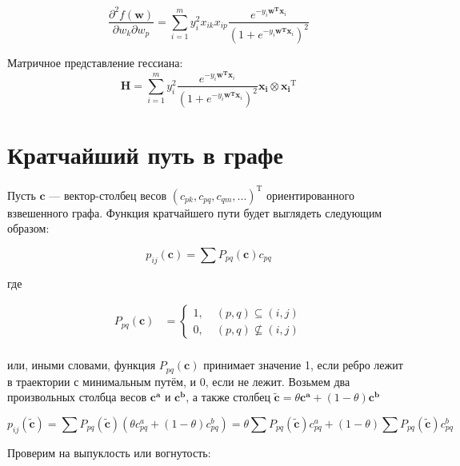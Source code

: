 	\begin{equation}
	\frac{\partial^2 f(\mathbf{w})}{\partial w_k \partial w_p}= \sum\limits_{i=1}^m
	y_i^2 x_{ik} x_{ip} \frac{e^{-y_i \mathbf{w^T x}_i}}{(1+e^{-y_i \mathbf{w^T
				x}_i})^2}
	\end{equation}	
	
	Матричное представление гессиана:
	\begin{equation}
	\mathbf{H} = \sum\limits_{i=1}^m y_i^2  \frac{e^{-y_i \mathbf{w^T
				x}_i}}{(1+e^{-y_i \mathbf{w^T x}_i})^2} \mathbf{x_i} \otimes
	\mathbf{x_i}^\text{T}
	\end{equation}
	
	\section{Кратчайший путь в графе}
	
	Пусть $\mathbf{c}$ --- вектор-столбец весов $(c_{pk}, c_{pq}, c_{qm},
	...)^{\text{T}}$ ориентированного взвешенного графа. Функция кратчайшего пути
	будет выглядеть следующим образом:
	
	\begin{equation}
	p_{ij}(\mathbf{c}) = \sum P_{pq}(\mathbf{c}) c_{pq}
	\end{equation}
	
	где 
	
	
	\begin{align}
	P_{pq}(\mathbf{c}) &=
	\left\{
	\begin{aligned}
	1 ,\; & (p,q) \subseteq (i,j) \\
	0 ,\; & (p,q) \nsubseteq (i,j)
	\end{aligned}
	\right. \\
	\end{align}
	
	или, иными словами, функция $P_{pq}(\mathbf{c})$ принимает значение 1, если
	ребро лежит в траектории с минимальным путём, и 0, если не лежит. Возьмем два
	произвольных столбца весов $\mathbf{c^a}$ и $\mathbf{c^b}$, а также столбец
	$\mathbf{\tilde{c}} = \theta \mathbf{c^a} + (1-\theta)\mathbf{c^b}$
	
	\begin{equation}
	p_{ij}(\mathbf{\tilde{c}}) = \sum P_{pq}(\mathbf{\tilde{c}}) (\theta c_{pq}^a +
	(1 - \theta) c_{pq}^b) = \theta \sum P_{pq}(\mathbf{\tilde{c}}) c_{pq}^a + (1 -
	\theta) \sum P_{pq}(\mathbf{\tilde{c}})  c_{pq}^b 
	\end{equation}
	
	Проверим на выпуклость или вогнутость:
	
